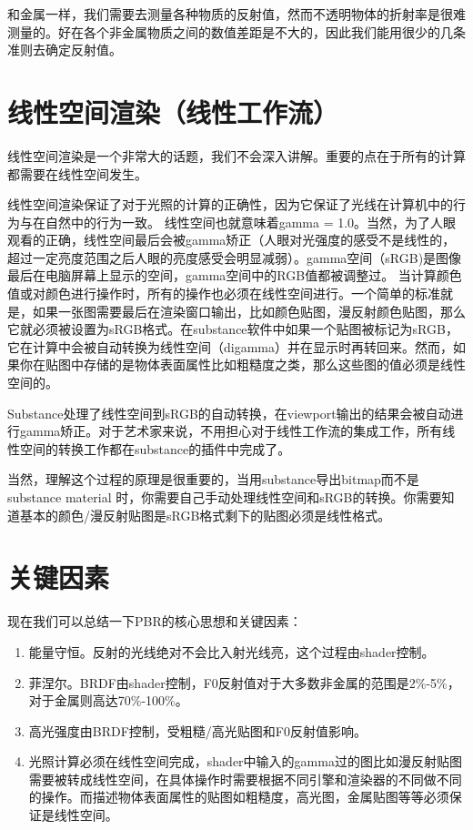 和金属一样，我们需要去测量各种物质的反射值，然而不透明物体的折射率是很难测量的。好在各个非金属物质之间的数值差距是不大的，因此我们能用很少的几条准则去确定反射值。

\section{线性空间渲染（线性工作流）}

线性空间渲染是一个非常大的话题，我们不会深入讲解。重要的点在于所有的计算都需要在线性空间发生。

线性空间渲染保证了对于光照的计算的正确性，因为它保证了光线在计算机中的行为与在自然中的行为一致。
线性空间也就意味着gamma = 1.0。当然，为了人眼观看的正确，线性空间最后会被gamma矫正（人眼对光强度的感受不是线性的，超过一定亮度范围之后人眼的亮度感受会明显减弱）。gamma空间（sRGB)是图像最后在电脑屏幕上显示的空间，gamma空间中的RGB值都被调整过。
当计算颜色值或对颜色进行操作时，所有的操作也必须在线性空间进行。一个简单的标准就是，如果一张图需要最后在渲染窗口输出，比如颜色贴图，漫反射颜色贴图，那么它就必须被设置为sRGB格式。在substance软件中如果一个贴图被标记为sRGB，它在计算中会被自动转换为线性空间（digamma）并在显示时再转回来。然而，如果你在贴图中存储的是物体表面属性比如粗糙度之类，那么这些图的值必须是线性空间的。

Substance处理了线性空间到sRGB的自动转换，在viewport输出的结果会被自动进行gamma矫正。对于艺术家来说，不用担心对于线性工作流的集成工作，所有线性空间的转换工作都在substance的插件中完成了。

当然，理解这个过程的原理是很重要的，当用substance导出bitmap而不是substance material 时，你需要自己手动处理线性空间和sRGB的转换。你需要知道基本的颜色/漫反射贴图是sRGB格式剩下的贴图必须是线性格式。

\section{关键因素}

现在我们可以总结一下PBR的核心思想和关键因素：

\begin{enumerate}
\item 能量守恒。反射的光线绝对不会比入射光线亮，这个过程由shader控制。
\item 菲涅尔。BRDF由shader控制，F0反射值对于大多数非金属的范围是2\%-5\%，对于金属则高达70\%-100\%。
\item 高光强度由BRDF控制，受粗糙/高光贴图和F0反射值影响。
\item 光照计算必须在线性空间完成，shader中输入的gamma过的图比如漫反射贴图需要被转成线性空间，在具体操作时需要根据不同引擎和渲染器的不同做不同的操作。而描述物体表面属性的贴图如粗糙度，高光图，金属贴图等等必须保证是线性空间。
\end{enumerate}

